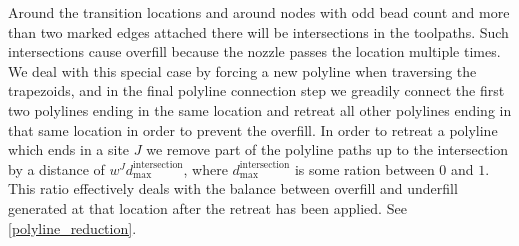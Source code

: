 Around the transition locations and around nodes with odd bead count and more than two marked edges attached there will be intersections in the toolpaths.
Such intersections cause overfill because the nozzle passes the location multiple times.
We deal with this special case by forcing a new polyline when traversing the trapezoids, and in the final polyline connection step we greadily connect the first two polylines ending in the same location and retreat all other polylines ending in that same location in order to prevent the overfill.
In order to retreat a polyline which ends in a site $J$ we remove part of the polyline paths up to the intersection by a distance of $w^J d_\text{max}^\text{intersection}$, where $d_\text{max}^\text{intersection}$ is some ration between $0$ and $1$.
This ratio effectively deals with the balance between overfill and underfill generated at that location after the retreat has been applied.
See \cref{polyline_reduction}.


